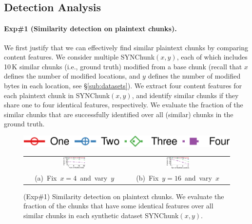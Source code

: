 \subsection{Detection Analysis}
\label{sub:evaluation-detection}



\paragraph{Exp\#1 (Similarity detection on plaintext chunks).}
We first justify that we can effectively find similar plaintext chunks by comparing content features. We consider multiple SYNChunk$(x, y)$, each of which includes 10\,K similar chunks (i.e., ground truth) modified from a base chunk (recall that $x$ defines the number of modified locations, and $y$ defines the number of modified bytes in each location, see \S\ref{sub:datasets}). We extract four content features for each plaintext chunk in SYNChunk$(x, y)$, and identify similar chunks if they share one to four identical features, respectively. We evaluate the fraction of the similar chunks that are successfully identified over all (similar) chunks in the ground truth.


\begin{figure}[t]
    \centering
    \includegraphics[width=.3\textwidth]{pic/featurespy/plot/detection/syn/fixed_pq_legend.pdf}
    \vspace{5pt}\\
    \begin{tabular}{@{\ }c@{\ }c}
        \includegraphics[width=0.23\textwidth]{pic/featurespy/plot/detection/syn/fixed_p_4.pdf} &
        \includegraphics[width=0.23\textwidth]{pic/featurespy/plot/detection/syn/fixed_q_16.pdf}\\
        \mbox{\small (a) Fix $x=4$ and vary $y$}&
        \mbox{\small (b) Fix $y=16$ and vary $x$}\\
    \end{tabular}
    \vspace{-6pt}
    \caption{(Exp\#1) Similarity detection on plaintext chunks. We evaluate the fraction of the chunks that have some identical features over all similar chunks in each synthetic dataset SYNChunk$(x, y)$.}
    \vspace{-6pt}
    \label{fig:expDetectionSynSim}
\end{figure}



